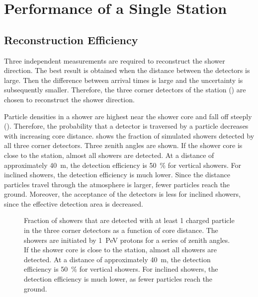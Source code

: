 \section{Performance of a Single Station}
\label{sec:direction-reconstruction-results}


\subsection{Reconstruction Efficiency}

Three independent measurements are required to reconstruct the shower direction.
 The best result is obtained when the distance between the detectors is
large. Then the difference between arrival times is large and the uncertainty
is subsequently smaller.
Therefore, the three corner detectors of the station
() are chosen to reconstruct the shower direction.

Particle densities in a shower are highest near the shower core and fall off
steeply ().  Therefore, the probability that a
detector is traversed by a particle decreases with increasing core distance.
 shows the fraction
of simulated showers detected by all three corner detectors.  Three zenith
angles are shown.  If the shower core is close to the station, almost all
showers are detected.  At a distance of approximately \SI{40}{\meter}, the
detection efficiency is \SI{50}{\percent} for vertical showers.  For inclined
showers, the detection efficiency is much lower. Since the distance particles
travel through the atmosphere is larger, fewer particles reach the
ground.  Moreover, the acceptance of the detectors is less for inclined showers,
since the effective detection area is decreased.

\begin{figure}
\centering

\caption{Fraction of showers that are detected with at least 1 charged particle
in the three corner detectors as a function of core distance.  The showers
are initiated by \SI{1}{\peta\electronvolt} protons for a series of zenith
angles. If the shower core is close to the station, almost all showers are
detected.  At a distance of approximately \SI{40}{\meter}, the detection
efficiency is \SI{50}{\percent} for vertical showers.  For inclined showers, the
detection efficiency is much lower, as fewer particles reach the ground.}
\label{fig:sim-detection-efficiency}
\end{figure}

